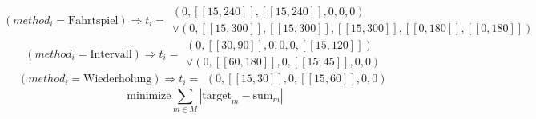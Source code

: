 \begin{equation*}
    (method_i = \text{Fahrtspiel})\Rightarrow t_i = \begin{array}{c}
                (0, [\![15, 240]\!], [\![15, 240]\!], 0, 0, 0) \\ 
           \vee (0, [\![15, 300]\!], [\![15, 300]\!], [\![15, 300]\!], [\![0, 180]\!], [\![0, 180]\!])
    \end{array}
\end{equation*}
\begin{equation*}
    (method_i = \text{Intervall})\Rightarrow t_i = \begin{array}{c}
            (0, [\![30, 90]\!], 0, 0, 0, [\![15, 120]\!]) \\ 
        \vee (0, [\![60,180]\!], 0, [\![15, 45]\!], 0, 0)
    \end{array}
\end{equation*}
\begin{equation*}
    (method_i = \text{Wiederholung})\Rightarrow t_i = \begin{array}{c}
            (0, [\![15, 30]\!], 0, [\![15, 60]\!], 0, 0)
    \end{array}
\end{equation*}
\begin{equation*}
    \text{minimize} \sum_{m\in M} |\text{target}_m - \text{sum}_m|
\end{equation*} 
\newpage

